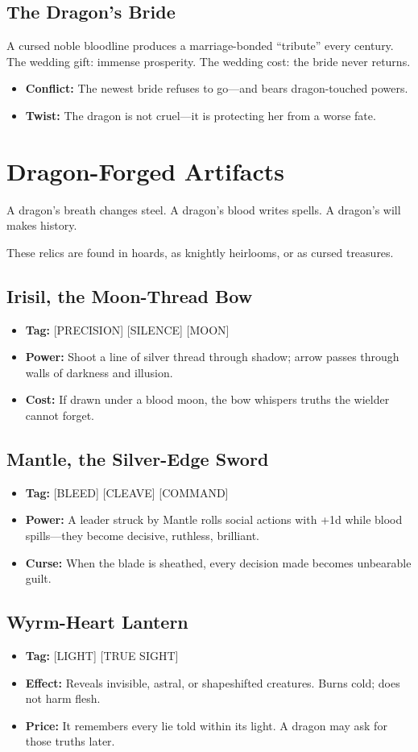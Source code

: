 \documentclass[11pt,letterpaper]{article}
\newcommand{\sectionheader}[1]{\section*{#1}}
\newcommand{\subsectionheader}[1]{\subsection*{#1}}
\begin{document}
\subsectionheader{The Dragon's Bride}
A cursed noble bloodline produces a marriage-bonded ``tribute'' every century.
The wedding gift: immense prosperity.
The wedding cost: the bride never returns.
\begin{itemize}[leftmargin=*]
\item \textbf{Conflict:} The newest bride refuses to go---and bears dragon-touched powers.
\item \textbf{Twist:} The dragon is not cruel---it is protecting her from a worse fate.
\end{itemize}

\newpage

\sectionheader{Dragon-Forged Artifacts}

A dragon's breath changes steel.  
A dragon's blood writes spells.  
A dragon's will makes history.

These relics are found in hoards, as knightly heirlooms, or as cursed treasures.

\subsectionheader{Irisil, the Moon-Thread Bow}
\begin{itemize}[leftmargin=*]
\item \textbf{Tag:} [PRECISION] [SILENCE] [MOON]
\item \textbf{Power:} Shoot a line of silver thread through shadow; arrow passes through walls of darkness and illusion.
\item \textbf{Cost:} If drawn under a blood moon, the bow whispers truths the wielder cannot forget.
\end{itemize}

\subsectionheader{Mantle, the Silver-Edge Sword}
\begin{itemize}[leftmargin=*]
\item \textbf{Tag:} [BLEED] [CLEAVE] [COMMAND]
\item \textbf{Power:} A leader struck by Mantle rolls social actions with +1d while blood spills---they become decisive, ruthless, brilliant.
\item \textbf{Curse:} When the blade is sheathed, every decision made becomes unbearable guilt.
\end{itemize}

\subsectionheader{Wyrm-Heart Lantern}
\begin{itemize}[leftmargin=*]
\item \textbf{Tag:} [LIGHT] [TRUE SIGHT]
\item \textbf{Effect:} Reveals invisible, astral, or shapeshifted creatures.  
Burns cold; does not harm flesh.
\item \textbf{Price:} It remembers every lie told within its light.  
A dragon may ask for those truths later.
\end{itemize}
\end{document}
